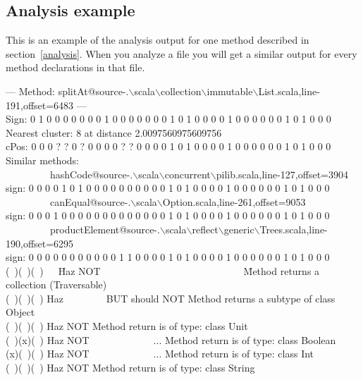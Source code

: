 \documentclass[12pt]{article}
\newcommand{\code}[1]{{\fontfamily{phv}\selectfont \small{\begin{tabbing} #1 \end{tabbing}}}}
\begin{document}
\subsection{Analysis example}
\label{annexe1}
This is an example of the analysis output for one method described in section~\ref{analysis}. When you analyze a file you will get a similar output for every method declarations in that file.\code{
--- Method: splitAt@source-.$\backslash$scala$\backslash$collection$\backslash$immutable$\backslash$List.scala,line-191,offset=6483 ---\\
Sign: 0 1 0 0 0 0 0 0 0 1 0 0 0 0 0 0 0 1 0 1 0 0 0 0 1 0 0 0 0 0 0 1 0 1 0 0 0\\
Nearest cluster: 8 at distance 2.0097560975609756\\
cPos: 0 0 0 ? ? 0 ? 0 0 0 0 ? ? 0 0 0 0 1 0 1 0 0 0 0 1 0 0 0 0 0 0 1 0 1 0 0 0\\
Similar methods:\\
\ \ \ \ \ \ \ \ \ hashCode@source-.$\backslash$scala$\backslash$concurrent$\backslash$pilib.scala,line-127,offset=3904\\
sign: 0 0 0 0 1 0 1 0 0 0 0 0 0 0 0 0 0 1 0 1 0 0 0 0 1 0 0 0 0 0 0 1 0 1 0 0 0\\
\ \ \ \ \ \ \ \ \ canEqual@source-.$\backslash$scala$\backslash$Option.scala,line-261,offset=9053\\
sign: 0 0 0 1 0 0 0 0 0 0 0 0 0 0 0 0 0 1 0 1 0 0 0 0 1 0 0 0 0 0 0 1 0 1 0 0 0\\
\ \ \ \ \ \ \ \ \ productElement@source-.$\backslash$scala$\backslash$reflect$\backslash$generic$\backslash$Trees.scala,line-190,offset=6295\\
sign: 0 0 0 0 0 0 0 0 0 0 0 1 1 0 0 0 0 1 0 1 0 0 0 0 1 0 0 0 0 0 0 1 0 1 0 0 0\\
(\ )(\ )(\ )\ \ \ \=Haz NOT\ \ \ \ \ \ \ \ \ \ \ \ \ \ \ \ \ \ \ \ \ \ \ \ \ \ \ \ \ \=Method returns a collection (Traversable)\\
(\ )(\ )(\ ) \>Haz \ \ \ \ \ \ \ \ BUT should NOT Method returns a subtype of class Object\\
(\ )(\ )(\ ) \>Haz NOT                \>Method return is of type: class Unit\\
(\ )(x)(\ ) \>Haz NOT\ \ \ \ \ \ \ \ \ \ \ \ \ ...       \>Method return is of type: class Boolean\\
(x)(\ )(\ ) \>Haz NOT\ \ \ \ \ \ \ \ \ \ \ \ \ ...       \>Method return is of type: class Int\\
(\ )(\ )(\ ) \>Haz NOT                \>Method return is of type: class String\\
}
\end{document}
